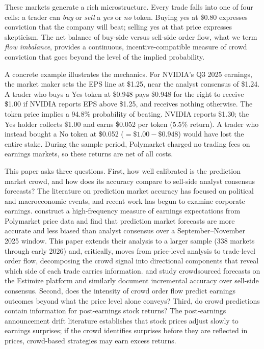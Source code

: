 \documentclass[11pt]{article}
\begin{document}
These markets generate a rich microstructure. Every trade falls into one of four cells: a trader can \textit{buy} or \textit{sell} a \textit{yes} or \textit{no} token. Buying yes at \$0.80 expresses conviction that the company will beat; selling yes at that price expresses skepticism. The net balance of buy-side versus sell-side order flow, what we term \textit{flow imbalance}, provides a continuous, incentive-compatible measure of crowd conviction that goes beyond the level of the implied probability.

A concrete example illustrates the mechanics. For NVIDIA's Q3 2025 earnings, the market maker sets the EPS line at \$1.25, near the analyst consensus of \$1.24. A trader who buys a Yes token at \$0.948 pays \$0.948 for the right to receive \$1.00 if NVIDIA reports EPS above \$1.25, and receives nothing otherwise. The token price implies a 94.8\% probability of beating. NVIDIA reports \$1.30; the Yes holder collects \$1.00 and earns \$0.052 per token (5.5\% return). A trader who instead bought a No token at \$0.052 ($= \$1.00 - \$0.948$) would have lost the entire stake. During the sample period, Polymarket charged no trading fees on earnings markets, so these returns are net of all costs.

This paper asks three questions. First, how well calibrated is the prediction market crowd, and how does its accuracy compare to sell-side analyst consensus forecasts? The literature on prediction market accuracy \citep{wolfers2004prediction, page2012prediction} has focused on political and macroeconomic events, and recent work has begun to examine corporate earnings. \citet{gomezcram2025financial} construct a high-frequency measure of earnings expectations from Polymarket price data and find that prediction market forecasts are more accurate and less biased than analyst consensus over a September--November 2025 window. This paper extends their analysis to a larger sample (338 markets through early 2026) and, critically, moves from price-level analysis to trade-level order flow, decomposing the crowd signal into directional components that reveal which side of each trade carries information. \citet{jame2016value} and \citet{schafhautle2024crowdsourced} study crowdsourced forecasts on the Estimize platform and similarly document incremental accuracy over sell-side consensus. Second, does the intensity of crowd order flow predict earnings outcomes beyond what the price level alone conveys? Third, do crowd predictions contain information for post-earnings stock returns? The post-earnings announcement drift literature \citep{ball1968empirical, bernard1989post} establishes that stock prices adjust slowly to earnings surprises; if the crowd identifies surprises before they are reflected in prices, crowd-based strategies may earn excess returns.
\end{document}
